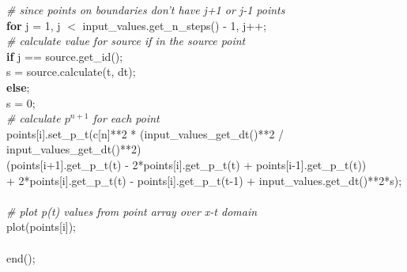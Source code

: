 \documentclass[]{article}
\begin{document}
\indent \textit{\# since points on boundaries don't have j+1 or j-1 points} \\
\indent \textbf{for} j = 1, j $<$ input\_values.get\_n\_steps() - 1, j++; \\
\indent \indent \textit{\# calculate value for source if in the source point} \\
\indent \indent \textbf{if} j == source.get\_id(); \\
\indent \indent \indent s = source.calculate(t, dt); \\
\indent \indent \textbf{else}; \\
\indent \indent \indent s = 0; \\
\indent \indent \textit{\# calculate $p^{n+1}$ for each point} \\
\indent \indent points[i].set\_p\_t(c[n]**2 * (input\_values\_get\_dt()**2 / input\_values\_get\_dt()**2) \\
\indent \indent *(points[i+1].get\_p\_t(t) - 2*points[i].get\_p\_t(t) + points[i-1].get\_p\_t(t)) \\
\indent \indent + 2*points[i].get\_p\_t(t) - points[i].get\_p\_t(t-1) + input\_values.get\_dt()**2*s); \\
\\
\textit{\# plot p(t) values from point array over x-t domain} \\
plot(points[i]); \\
\\
end();
\end{document}
